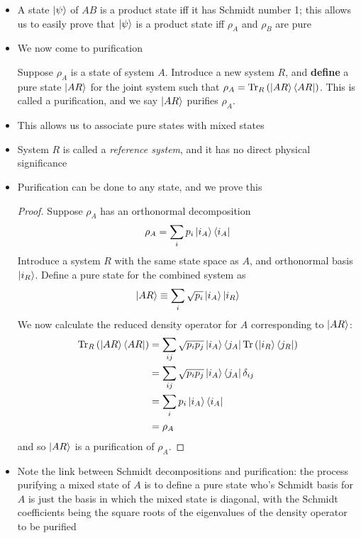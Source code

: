 \documentclass[12pt,a4paper]{article}
\numberwithin{equation}{section}
\newcommand{\ketbra}[2]{\ket{#1}\bra{#2}}
\newcommand{\ketbras}[1]{\ketbra{#1}{#1}}
\begin{document}
\begin{itemize}
		\item A state $\ket{\psi}$ of $AB$ is a product state iff it has Schmidt number 1; this allows us to easily prove that $\ket{\psi}$ is a product state iff $\rho_{A}$ and $\rho_{B}$ are pure
		\item We now come to purification
		\begin{theorem}
			Suppose $\rho_{A}$ is a state of system $A$. Introduce a new system $R$, and \textbf{define} a pure state $\ket{AR}$ for the joint system such that $\rho_{A}=\text{Tr}_{R}\left(\ketbras{AR}\right)$. This is called a purification, and we say $\ket{AR}$ purifies $\rho_{A}$.
		\end{theorem}
		\item This allows us to associate pure states with mixed states
		\item System $R$ is called a \textit{reference system}, and it has no direct physical significance
		\item Purification can be done to any state, and we prove this
		\newtheorem{proof}{Proof}
		\begin{proof}
			Suppose $\rho_{A}$ has an orthonormal decomposition
			\begin{equation}
				\rho_{A}=\sum_{i}p_{i}\ketbras{i_{A}}
			\end{equation}
			Introduce a system $R$ with the same state space as $A$, and orthonormal basis $\ket{i_{R}}$. Define a pure state for the combined system as
			\begin{equation}
				\ket{AR}\equiv\sum_{i}\sqrt{p_{i}}\ket{i_{A}}\ket{i_{R}}
			\end{equation}
			We now calculate the reduced density operator for $A$ corresponding to $\ket{AR}$:
			\begin{equation}
				\begin{aligned}
					\text{Tr}_{R}\left(\ketbras{AR}\right)&=\sum_{ij}\sqrt{p_{i}p_{j}}\ketbra{i_{A}}{j_{A}}\text{Tr}\left(\ketbra{i_{R}}{j_{R}}\right)\\&=\sum_{ij}\sqrt{p_{i}p_{j}}\ketbra{i_{A}}{j_{A}}\delta_{ij}\\
					&=\sum_{i}p_{i}\ketbras{i_{A}}\\&=\rho_{A}
				\end{aligned}
			\end{equation}
			and so $\ket{AR}$ is a purification of $\rho_{A}$.
		\end{proof}
		\item Note the link between Schmidt decompositions and purification: the process purifying a mixed state of $A$ is to define a pure state who's Schmidt basis for $A$ is just the basis in which the mixed state is diagonal, with the Schmidt coefficients being the square roots of the eigenvalues of the density operator to be purified
	\end{itemize}
\end{document}

